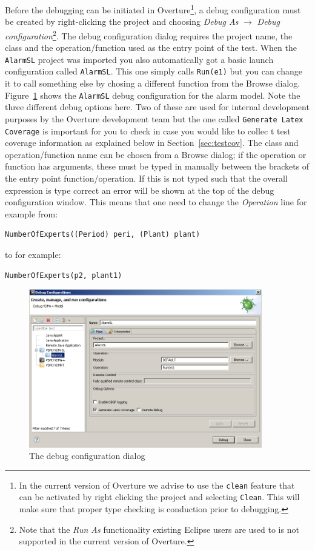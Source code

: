 Before the debugging can be initiated in Overture\footnote{In the
  current version of Overture we advise to use the \texttt{clean}
  feature that can be activated by right clicking the project and
  selecting \texttt{Clean}. This will make sure that proper type
  checking is conduction prior to debugging.}, a debug
configuration must be created by right-clicking the project and
choosing \emph{Debug As} $ \rightarrow $ \emph{Debug
configuration}\footnote{Note that the
  \emph{Run As} functionality existing Eclipse users are used to is
  not supported in the current version of Overture.}. 
The debug configuration dialog requires the project
name, the class and the operation/function used as the entry point of the
test. When the \texttt{AlarmSL} project was imported you also
automatically got a basic launch configuration called
\texttt{AlarmSL}. This one simply calls \texttt{Run(e1)} but you can
change it to call something else by chosing a different function from
the Browse dialog.
Figure~\ref{fig:debugConfiguration} shows the \texttt{AlarmSL} debug
configuration for the alarm model. Note the three different debug
options here. Two of these are used for internal development purposes
by the Overture development team but the one called \texttt{Generate
  Latex Coverage} is important for you to check in case you would like
to collec t test coverage information as explained below in
Section~\ref{sec:testcov}. The class and operation/function
name can be chosen from a Browse dialog; if the operation or function
has arguments, these must be typed in manually between the brackets of
the entry point function/operation. If this is not typed such that the
overall expression is type correct an error will be shown at the top
of the debug configuration window. This means that one need to change
the \emph{Operation} line for example from:
  
\begin{lstlisting}
NumberOfExperts((Period) peri, (Plant) plant)
\end{lstlisting}
\noindent to for example:
\begin{lstlisting}
NumberOfExperts(p2, plant1)
\end{lstlisting}

\begin{figure}[htp]
\begin{center}
  \includegraphics[width=4in]{figures/debuglauncer}
  \caption{The debug configuration dialog}
  \label{fig:debugConfiguration}
\end{center}
\end{figure}

